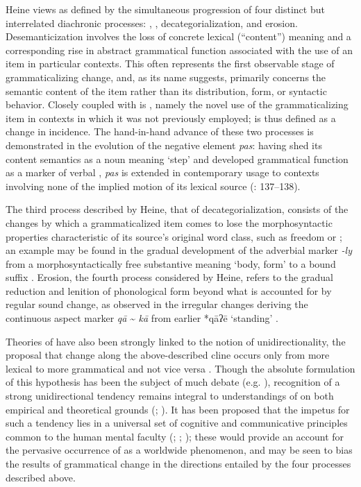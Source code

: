 \documentclass[output=paper]{langsci/langscibook}
\begin{document}
Heine views  as defined by the simultaneous progression of four distinct but interrelated diachronic processes: , , decategorialization, and erosion. Desemanticization involves the loss of concrete lexical (“content”) meaning and a corresponding rise in abstract grammatical function associated with the use of an item in particular contexts. This often represents the first observable stage of grammaticalizing change, and, as its name suggests, primarily concerns the semantic content of the item rather than its distribution, form, or syntactic behavior. Closely coupled with  is , namely the novel use of the grammaticalizing item in contexts in which it was not previously employed;  is thus defined as a change in incidence.  The hand-in-hand advance of these two processes is demonstrated in the evolution of the  negative element \textit{pas}: having shed its content semantics as a noun meaning ‘step’ and developed grammatical function as a marker of verbal , \textit{pas} is extended in contemporary usage to contexts involving none of the implied motion of its lexical source (\citealt{Hansen2009}: 137–138). 

The third process described by Heine, that of decategorialization, consists of the changes by which a grammaticalized item comes to lose the morphosyntactic properties characteristic of its source’s original word class, such as  freedom or  ; an example may be found in the gradual development of the  adverbial marker \textit{{}-ly} from a morphosyntactically free substantive meaning ‘body, form’ to a bound  suffix \citep[505]{Ramat2011}. Erosion, the fourth process considered by Heine, refers to the gradual reduction and lenition of phonological form beyond what is accounted for by regular sound change, as observed in the irregular changes deriving the  continuous aspect marker \textit{qā} {\textasciitilde} \textit{kā} from earlier *{qāʔē} ‘standing’ \citep[134]{Rubin2005}.

Theories of  have also been strongly linked to the notion of unidirectionality, the proposal that change along the above-described cline occurs only from more lexical to more grammatical and not vice versa \citep{Lehmann2015}.  Though the absolute formulation of this hypothesis has been the subject of much debate (e.g. \citealt{Norde2009}), recognition of a strong unidirectional tendency remains integral to understandings of  on both empirical and theoretical grounds (\citealt{Haspelmath1998}; \citealt{Heine2007}). It has been proposed that the impetus for such a tendency lies in a universal set of cognitive and communicative principles common to the human mental faculty (\citealt{Claudi1986}; \citealt{Bybee2003}; \citealt{Lehmann2015}); these would provide an account for the pervasive occurrence of  as a worldwide  phenomenon, and may be seen to bias the results of grammatical change in the directions entailed by the four processes described above.
\end{document}
